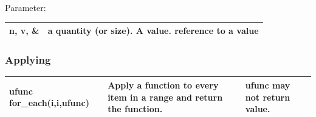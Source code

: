 \documentclass[a4paper,12pt,twoside]{book}
\begin{document}
Parameter:  \\
\begin{tabular}{| p{} |p{}|}
\hline n, v, \&  & 	a quantity (or size). A value. reference to a value \\
\hline
\end{tabular}

\subsubsection{Applying}
\begin{tabular}{| p{} |p{}|p{}|}
\hline ufunc for\_each(i,i,ufunc) &Apply a function to every item in a range and return the function. &  ufunc may not return value.  \\
\hline
\end{tabular}
\end{document}
